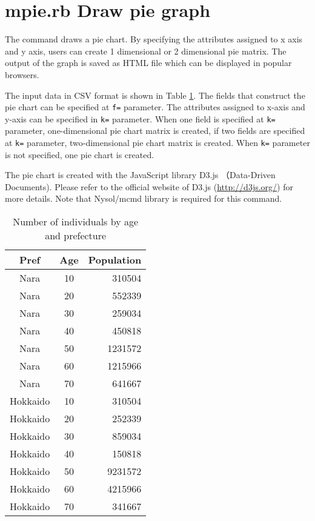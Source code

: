 


\section{mpie.rb Draw pie graph\label{sect:mpie}}

The command draws a pie chart. 
By specifying the attributes assigned to x axis and y axis,  users can create 1 dimensional or 2 dimensional pie matrix. 
The output of the graph is saved as HTML file which can be displayed in popular browsers. 

The input data in CSV format is shown in Table \ref{tbl:mpie_input2}. The fields that construct the pie chart can be specified at \verb|f=| parameter. 
The attributes assigned to x-axis and y-axis can be specified in \verb|k=| parameter. 
When one field is specified at \verb|k=| parameter, one-dimensional pie chart matrix is created, 
if two fields are specified at \verb|k=| parameter, two-dimensional pie chart matrix is created. 
When \verb|k=| parameter is not specified, one pie chart is created. 

The pie chart is created with the JavaScript library D3.js （Data-Driven Documents). Please refer to the official website of D3.js  (\url{http://d3js.org/}) for more details.   
 Note that Nysol/mcmd library is required for this command. 
 

\begin{table}[http]
\begin{center}
\caption{Number of individuals by age  and prefecture \label{tbl:mpie_input2}}
{\small
\begin{tabular}[t]{ccr}
\hline
Pref&Age&Population \\
\hline
Nara&10&310504\\
Nara&20&552339\\
Nara&30&259034\\
Nara&40&450818\\
Nara&50&1231572\\
Nara&60&1215966\\
Nara&70&641667\\
Hokkaido&10&310504\\
Hokkaido&20&252339\\
Hokkaido&30&859034\\
Hokkaido&40&150818\\
Hokkaido&50&9231572\\
Hokkaido&60&4215966\\
Hokkaido&70&341667\\
\hline
\end{tabular}
}
\end{center}
\end{table}

